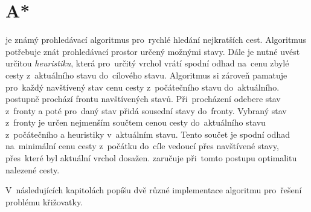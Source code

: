 \section{A*}\label{sec:a_star}


 je známý prohledávací algoritmus pro~rychlé hledání nejkratších cest.
Algoritmus potřebuje znát prohledávací prostor určený možnými stavy.
Dále je nutné uvést určitou \emph{heuristiku}, která pro~určitý vrchol vrátí
spodní odhad na~cenu zbylé cesty z~aktuálního stavu do~cílového stavu.
Algoritmus si zároveň pamatuje pro~každý navštívený stav cenu cesty z~počátečního stavu do~aktuálního.
 postupně prochází frontu navštívených stavů.
Při~procházení odebere stav z~fronty a poté pro~daný stav přidá sousední stavy do~fronty.
Vybraný stav z~fronty je určen nejmenším součtem cenou cesty
do~aktuálního stavu z~počátečního a heuristiky v~aktuálním stavu.
Tento součet je spodní odhad na~minimální cenu cesty z~počátku do~cíle vedoucí přes navštívené stavy,
přes~které byl aktuální vrchol dosažen.
 zaručuje při~tomto postupu optimalitu nalezené cesty.

V~následujících kapitolách popíšu dvě různé implementace  algoritmu pro~řešení problému křižovatky.



%

%

%
